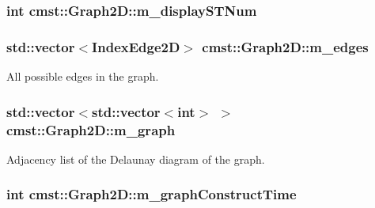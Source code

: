 \subsubsection[{\texorpdfstring{m\+\_\+display\+S\+T\+Num}{m_displaySTNum}}]{\setlength{\rightskip}{0pt plus 5cm}int cmst\+::\+Graph2\+D\+::m\+\_\+display\+S\+T\+Num\hspace{0.3cm}{\ttfamily [private]}}\hypertarget{classcmst_1_1_graph2_d_aa5479777b7d8650b85c15b1f8a54bd95}{}\label{classcmst_1_1_graph2_d_aa5479777b7d8650b85c15b1f8a54bd95}
\subsubsection[{\texorpdfstring{m\+\_\+edges}{m_edges}}]{\setlength{\rightskip}{0pt plus 5cm}std\+::vector$<${\bf Index\+Edge2D}$>$ cmst\+::\+Graph2\+D\+::m\+\_\+edges\hspace{0.3cm}{\ttfamily [protected]}}\hypertarget{classcmst_1_1_graph2_d_a31a6b042c1c1941ee59672b842c7d3c9}{}\label{classcmst_1_1_graph2_d_a31a6b042c1c1941ee59672b842c7d3c9}


All possible edges in the graph. 

\subsubsection[{\texorpdfstring{m\+\_\+graph}{m_graph}}]{\setlength{\rightskip}{0pt plus 5cm}std\+::vector$<$std\+::vector$<$int$>$ $>$ cmst\+::\+Graph2\+D\+::m\+\_\+graph\hspace{0.3cm}{\ttfamily [protected]}}\hypertarget{classcmst_1_1_graph2_d_a5df9c78edb4f5c68da11b01e44061dc5}{}\label{classcmst_1_1_graph2_d_a5df9c78edb4f5c68da11b01e44061dc5}


Adjacency list of the Delaunay diagram of the graph. 

\subsubsection[{\texorpdfstring{m\+\_\+graph\+Construct\+Time}{m_graphConstructTime}}]{\setlength{\rightskip}{0pt plus 5cm}int cmst\+::\+Graph2\+D\+::m\+\_\+graph\+Construct\+Time\hspace{0.3cm}{\ttfamily [private]}}\hypertarget{classcmst_1_1_graph2_d_ac594da90a2c9bd7332644532969ef11f}{}\label{classcmst_1_1_graph2_d_ac594da90a2c9bd7332644532969ef11f}


